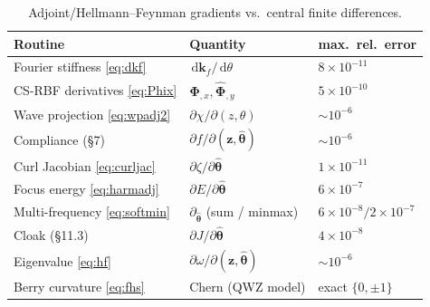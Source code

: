 \documentclass[11pt]{article}
\newcommand{\vthh}{\hat{\bm{\theta}}}
\newcommand{\vz}{\mathbf{z}}
\newcommand{\vPhi}{\hat{\bm{\Phi}}}
\newcommand{\rmd}{\,\mathrm{d}}
\begin{document}
\begin{table}[h]
\centering
\caption{Adjoint/Hellmann--Feynman gradients vs.\ central finite differences.}
\label{tab:verify}
\begin{tabular}{lll}
\toprule
Routine & Quantity & max.\ rel.\ error\\
\midrule
Fourier stiffness \eqref{eq:dkf} & $\rmd\mathbf{k}_f/\rmd\theta$ & $8\times10^{-11}$\\
CS-RBF derivatives \eqref{eq:Phix} & $\vPhi_{,x},\vPhi_{,y}$ & $5\times10^{-10}$\\
Wave projection \eqref{eq:wpadj2} & $\partial\hat\chi/\partial(z,\theta)$ & $\sim10^{-6}$\\
Compliance (\S7) & $\partial f/\partial(\vz,\vthh)$ & $\sim10^{-6}$\\
Curl Jacobian \eqref{eq:curljac} & $\partial\zeta/\partial\vthh$ & $1\times10^{-11}$\\
Focus energy \eqref{eq:harmadj} & $\partial E/\partial\vthh$ & $6\times10^{-7}$\\
Multi-frequency \eqref{eq:softmin} & $\partial_{\vthh}$ (sum / minmax) & $6\times10^{-8}/2\times10^{-7}$\\
Cloak (\S11.3) & $\partial J/\partial\vthh$ & $4\times10^{-8}$\\
Eigenvalue \eqref{eq:hf} & $\partial\omega/\partial(\vz,\vthh)$ & $\sim10^{-6}$\\
Berry curvature \eqref{eq:fhs} & Chern (QWZ model) & exact $\{0,\pm1\}$\\
\bottomrule
\end{tabular}
\end{table}
\end{document}
